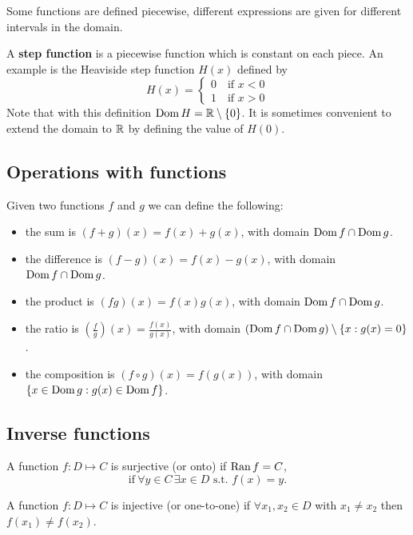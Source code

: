\documentclass[10pt, a4paper]{article}
\begin{document}
Some functions are defined piecewise, different expressions are given for different intervals in the domain.

A \textbf{step function} is a piecewise function which is constant on each piece. An example is the Heaviside step function $H(x)$ defined by
\[
H(x) = \begin{cases}
    0\quad\text{if } x < 0 \\
    1\quad\text{if } x > 0
\end{cases}
\]
Note that with this definition $\operatorname{Dom} H = \mathbb{R} \setminus \{0\}$. It is sometimes convenient to extend the domain to $\mathbb{R}$ by defining the value of $H(0)$.

\subsection{Operations with functions}
Given two functions $f$ and $g$ we can define the following:

\begin{itemize}
    \item the sum is $(f + g)(x) = f(x) + g(x)$, with domain $\operatorname{Dom} f \cap \operatorname{Dom} g$.
    \item the difference is $(f - g)(x) = f(x) - g(x)$, with domain $\operatorname{Dom} f \cap \operatorname{Dom} g$.
    \item the product is $(fg)(x) = f(x)g(x)$, with domain $\operatorname{Dom} f \cap \operatorname{Dom} g$.
    \item the ratio is $\left(\frac{f}{g}\right)(x) = \frac{f(x)}{g(x)}$, with domain $(\operatorname{Dom} f \cap \operatorname{Dom} g) \setminus \{x: g(x) = 0\}$.
    \item the composition is $(f \circ g)(x) = f(g(x))$, with domain $\{x \in \operatorname{Dom} g : g(x) \in \operatorname{Dom} f\}$.
\end{itemize}

\subsection{Inverse functions}
\begin{definition}
    A function $f: D \mapsto C$ is surjective (or onto) if $\operatorname{Ran} f = C$,
    \[
    \text{if}\  \forall y \in C\, \exists x \in D \text{ s.t. } f(x) = y.
    \]
\end{definition}

\begin{definition}
    A function $f: D \mapsto C$ is injective (or one-to-one) if $\forall x_1, x_2 \in D$ with $x_1 \neq x_2$ then $f(x_1) \neq f(x_2)$.
\end{definition}
\end{document}
